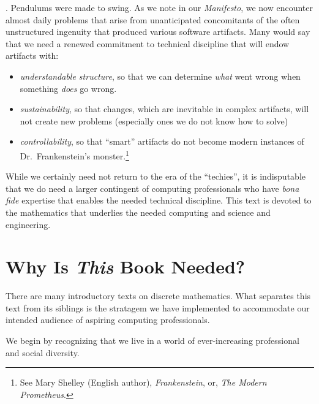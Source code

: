 .
Pendulums were made to swing.  As we note in our {\it Manifesto}, we now encounter almost daily problems that arise from unanticipated concomitants of the often unstructured ingenuity that produced various software artifacts.  Many would say that we need a renewed commitment to technical discipline that will endow artifacts with:
\begin{itemize}
\item
{\em understandable structure}, so that we can determine {\em what} went wrong when something {\em does} go wrong.
\medskip\item
{\em sustainability}, so that changes, which are inevitable in complex artifacts, will not create new problems (especially ones we do not know how to solve)
\medskip\item
{\em controllability}, so that ``smart'' artifacts do not become modern instances of Dr.~Frankenstein's monster.\footnote{See Mary Shelley (English author), {\it Frankenstein}, or, {\it The Modern Prometheus}.}
\end{itemize}
While we certainly need not return to the era of the ``techies'', it is indisputable that we do need a larger contingent of computing professionals who have {\em bona fide} expertise that enables the needed technical discipline.  This text is devoted to the mathematics that underlies the needed computing and science and engineering.


\section{Why Is {\em This} Book Needed?}
\label{sec:thisbookneed}

There are many introductory texts on discrete mathematics.  What separates this text from its siblings is the stratagem we have implemented to accommodate our intended audience of aspiring computing professionals.

\smallskip

We begin by recognizing that we live in a world of ever-increasing professional and social diversity.

\medskip

